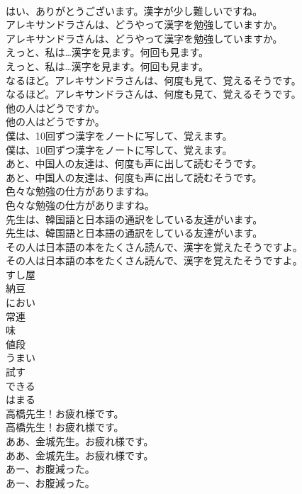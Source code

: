 \documentclass[8pt]{extreport}
\begin{document}
\begin{CJK}{UTF8}{min}
\\	はい、ありがとうございます。漢字が少し難しいですね。 
\\	アレキサンドラさんは、どうやって漢字を勉強していますか。	
\\	アレキサンドラさんは、どうやって漢字を勉強していますか。 
\\	えっと、私は…漢字を見ます。何回も見ます。	
\\	えっと、私は…漢字を見ます。何回も見ます。 
\\	なるほど。アレキサンドラさんは、何度も見て、覚えるそうです。	
\\	なるほど。アレキサンドラさんは、何度も見て、覚えるそうです。 
\\	他の人はどうですか。	
\\	他の人はどうですか。 
\\	僕は、10回ずつ漢字をノートに写して、覚えます。	
\\	僕は、10回ずつ漢字をノートに写して、覚えます。 
\\	あと、中国人の友達は、何度も声に出して読むそうです。	
\\	あと、中国人の友達は、何度も声に出して読むそうです。 
\\	色々な勉強の仕方がありますね。	
\\	色々な勉強の仕方がありますね。 
\\	先生は、韓国語と日本語の通訳をしている友達がいます。	
\\	先生は、韓国語と日本語の通訳をしている友達がいます。 
\\	その人は日本語の本をたくさん読んで、漢字を覚えたそうですよ。	
\\	その人は日本語の本をたくさん読んで、漢字を覚えたそうですよ。 
\\	すし屋
\\	納豆
\\	におい
\\	常連
\\	味
\\	値段
\\	うまい
\\	試す
\\	できる
\\	はまる
\\	高橋先生！お疲れ様です。	
\\	高橋先生！お疲れ様です。 
\\	ああ、金城先生。お疲れ様です。	
\\	ああ、金城先生。お疲れ様です。 
\\	あー、お腹減った。	
\\	あー、お腹減った。 

\end{CJK}
\end{document}
